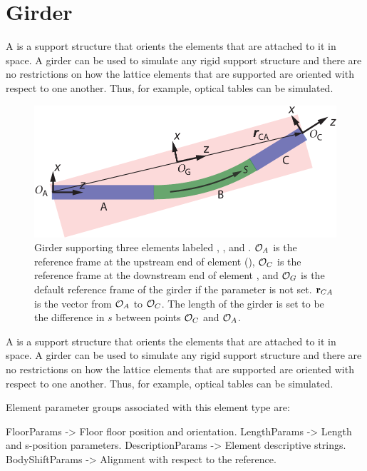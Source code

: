 \section{Girder}
\label{s:girder}

A  is a support structure that orients the elements that are attached to it in space. A
girder can be used to simulate any rigid support structure and there are no restrictions on how the
lattice elements that are supported are oriented with respect to one another.  Thus, for example,
optical tables can be simulated.

\begin{figure}[t]
  \centering
  \includegraphics{girder.pdf}
  \caption[Girder example.] {
Girder supporting three elements labeled , , and .  ${\cal O}_A$ is the reference
frame at the upstream end of element  (), ${\cal O}_C$ is the reference
frame at the downstream end of element , and ${\cal O}_G$ is the default  reference
frame of the girder if the  parameter is not set. ${\bf r}_{CA}$ is the vector from
${\cal O}_A$ to ${\cal O}_C$. The length  of the girder is set to be the difference in $s$ between
points ${\cal O}_C$ and ${\cal O}_A$.
  }
  \label{f:girder}
\end{figure}

A  is a support structure that orients the elements that are attached to it in space. A
girder can be used to simulate any rigid support structure and there are no restrictions on how the
lattice elements that are supported are oriented with respect to one another.  Thus, for example,
optical tables can be simulated.

Element parameter groups associated with this element type are:
\TOPrule
\begin{example}
  FloorParams -> Floor floor position and orientation.  
  LengthParams        -> Length and s-position parameters.  
  DescriptionParams   -> Element descriptive strings.  
  BodyShiftParams     -> Alignment with respect to the reference. 
\end{example}
\BOTTOMrule

